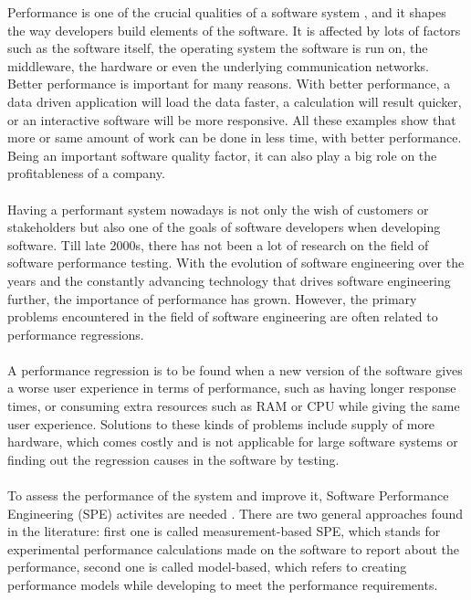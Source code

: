 \documentclass{seal_thesis}
\begin{document}
Performance is one of the crucial qualities of a software system \cite{Woodside:2007:FSP:1253532.1254717}, and it shapes the way developers build elements of the software. It is affected by lots of factors such as the software itself, the operating system the software is run on, the middleware, the hardware or even the underlying communication networks\cite{Woodside:2007:FSP:1253532.1254717}. Better performance is important for many reasons. With better performance, a data driven application  will load the data faster, a calculation will result quicker, or an interactive software will be more responsive. All these examples show that more or same amount of work can be done in less time, with better performance. Being an important software quality factor, it can also play a big role on the profitableness of a company\cite{Nguyen:2014:ICS:2597073.2597092}\cite{costa2019}.\\
\\
Having a performant system nowadays is not only the wish of customers or stakeholders but also one of the goals of software developers when developing software. Till late 2000s, there has not been a lot of research on the field of software performance testing\cite{weyuker2000experience}. With the evolution of software engineering over the years and the constantly advancing technology that drives software engineering further, the importance of performance has grown. However, the primary problems encountered in the field of software engineering are often related to performance regressions\cite{weyuker2000experience}.\\
\\
A performance regression is to be found when a new version of the software gives a worse user experience in terms of performance, such as having longer response times, or consuming extra resources such as RAM or CPU while giving the same user experience\cite{Nguyen:2014:ICS:2597073.2597092}. Solutions to these kinds of problems include supply of more hardware, which comes costly and is not applicable for large software systems \cite{Nguyen:2014:ICS:2597073.2597092} or finding out the regression causes in the software by testing.\\
\\
To assess the performance of the system and improve it, Software Performance Engineering (SPE) activites are needed \cite{Woodside:2007:FSP:1253532.1254717}. There are two general approaches found in the literature: first one is called measurement-based SPE, which stands for experimental performance calculations made on the software to report about the performance, second one is called model-based, which refers to creating performance models while developing to meet the performance requirements\cite{Woodside:2007:FSP:1253532.1254717}. \\ 
\end{document}
